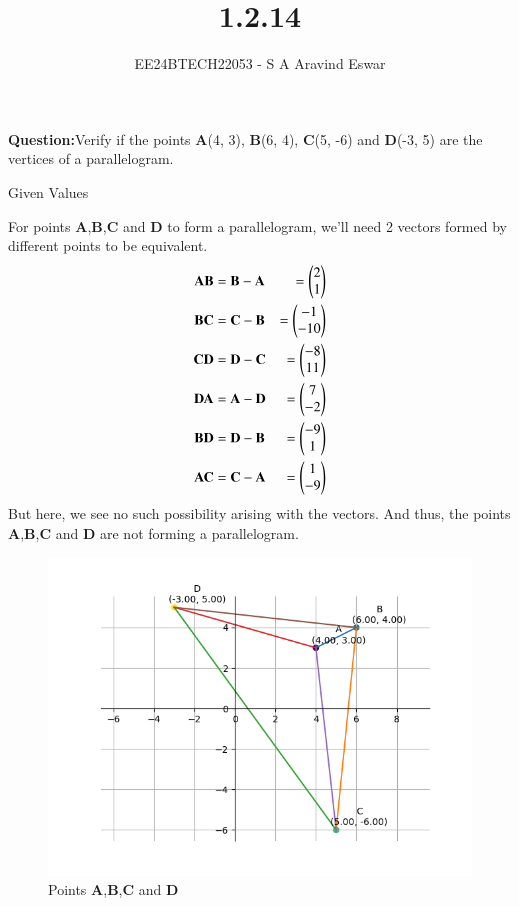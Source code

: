 \documentclass[journal,12pt,twocolumn]{IEEEtran}
\theoremstyle{remark}
\begin{document}

\vspace{3cm}

\title{1.2.14}
\author{EE24BTECH22053 - S A Aravind Eswar}
\maketitle
\newpage
\bigskip

\renewcommand{\thefigure}{\theenumi}
\renewcommand{\thetable}{\theenumi}

\textbf{Question:}Verify if the points \textbf{A}(4, 3), \textbf{B}(6, 4), \textbf{C}(5, -6) and \textbf{D}(-3, 5) are the vertices of a
parallelogram.\\
\solution 
\begin{table}[h]
	\centering
	
	\caption{Given Values}
	\label{tab:1}
\end{table}

For points \textbf{A},\textbf{B},\textbf{C} and \textbf{D} to form a parallelogram, we'll need 2 vectors formed by different points to be equivalent.
\begin{align*}\textbf{AB} &= \textbf{B}-\textbf{A} &= \begin{pmatrix}2\\1\end{pmatrix}\\\textbf{BC} &= \textbf{C}-\textbf{B} &= \begin{pmatrix}-1\\-10\end{pmatrix}\\\textbf{CD} &=\textbf{D}-\textbf{C} &=\begin{pmatrix}-8\\11\end{pmatrix}\\\textbf{DA} &= \textbf{A}-\textbf{D} &= \begin{pmatrix}7\\-2\end{pmatrix}\\\textbf{BD} &= \textbf{D}-\textbf{B} &= \begin{pmatrix}-9\\1\end{pmatrix}\\\textbf{AC} &= \textbf{C}-\textbf{A} &= \begin{pmatrix}1\\-9\end{pmatrix}\\\end{align*}
But here, we see no such possibility arising with the vectors. And thus, the points \textbf{A},\textbf{B},\textbf{C} and \textbf{D} are not forming a parallelogram.


\begin{figure}[h]
    \centering
    \includegraphics[width=\columnwidth]{figs/fig1.png}
    \caption{Points \textbf{A},\textbf{B},\textbf{C} and \textbf{D}}
 \end{figure}
\end{document}
